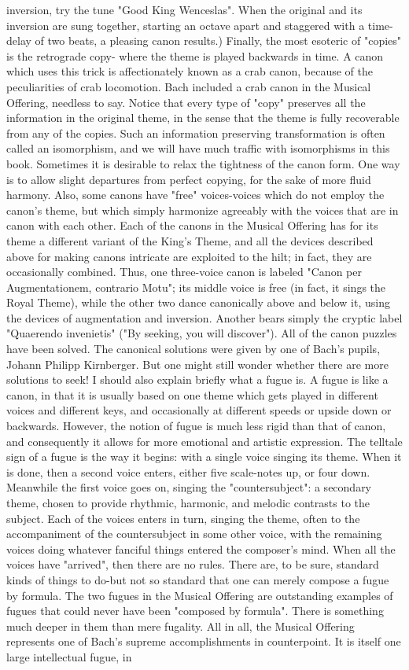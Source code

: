 inversion, try the tune "Good King Wenceslas". When the original and its inversion are sung together, starting an octave apart and staggered with a time-delay of two beats, a pleasing canon results.) Finally, the most esoteric of "copies" is the retrograde copy- where the theme is played backwards in time. A canon which uses this trick is affectionately known as a crab canon, because of the peculiarities of crab locomotion. Bach included a crab canon in the Musical Offering, needless to say. Notice that every type of "copy" preserves all the information in the original theme, in the sense that the theme is fully recoverable from any of the copies. Such an information preserving transformation is often called an isomorphism, and we will have much traffic with isomorphisms in this book. Sometimes it is desirable to relax the tightness of the canon form. One way is to allow slight departures from perfect copying, for the sake of more fluid harmony. Also, some canons have "free" voices-voices which do not employ the canon's theme, but which simply harmonize agreeably with the voices that are in canon with each other. Each of the canons in the Musical Offering has for its theme a different variant of the King's Theme, and all the devices described above for making canons intricate are exploited to the hilt; in fact, they are occasionally combined. Thus, one three-voice canon is labeled "Canon per Augmentationem, contrario Motu"; its middle voice is free (in fact, it sings the Royal Theme), while the other two dance canonically above and below it, using the devices of augmentation and inversion. Another bears simply the cryptic label "Quaerendo invenietis" ("By seeking, you will discover"). All of the canon puzzles have been solved. The canonical solutions were given by one of Bach's pupils, Johann Philipp Kirnberger. But one might still wonder whether there are more solutions to seek! I should also explain briefly what a fugue is. A fugue is like a canon, in that it is usually based on one theme which gets played in different voices and different keys, and occasionally at different speeds or upside down or backwards. However, the notion of fugue is much less rigid than that of canon, and consequently it allows for more emotional and artistic expression. The telltale sign of a fugue is the way it begins: with a single voice singing its theme. When it is done, then a second voice enters, either five scale-notes up, or four down. Meanwhile the first voice goes on, singing the "countersubject": a secondary theme, chosen to provide rhythmic, harmonic, and melodic contrasts to the subject. Each of the voices enters in turn, singing the theme, often to the accompaniment of the countersubject in some other voice, with the remaining voices doing whatever fanciful things entered the composer's mind. When all the voices have "arrived", then there are no rules. There are, to be sure, standard kinds of things to do-but not so standard that one can merely compose a fugue by formula. The two fugues in the Musical Offering are outstanding examples of fugues that could never have been "composed by formula". There is something much deeper in them than mere fugality. All in all, the Musical Offering represents one of Bach's supreme accomplishments in counterpoint. It is itself one large intellectual fugue, in 
